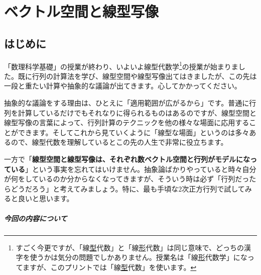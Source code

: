 \chapter{ベクトル空間と線型写像}

\vspace{-0.8zw}

\section{はじめに}

「数理科学基礎」の授業が終わり、いよいよ線型代数学\footnote{すごく今更ですが、「線\uline{型}代数」と「線\uline{形}代数」は同じ意味で、どっちの漢字を使うかは気分の問題でしかありません。授業名は「線\uline{形}代数学」になってますが、このプリントでは「線\uline{型}代数」を使います。}の授業が始まりました。既に行列の計算法を学び、線型空間や線型写像出てはきましたが、この先は一段と重たい計算や抽象的な議論が出てきます。心してかかってください。

抽象的な議論をする理由は、ひとえに「適用範囲が広がるから」です。普通に行列を計算しているだけでもそれなりに得られるものはあるのですが、線型空間と線型写像の言葉によって、行列計算のテクニックを他の様々な場面に応用することができます。そしてこれから見ていくように「線型な場面」というのは多々あるので、線型代数を理解しているとこの先の人生で非常に役立ちます。

一方で「\textbf{線型空間と線型写像は、それぞれ数ベクトル空間と行列がモデルになっている}」という事実を忘れてはいけません。抽象論ばかりやっていると時々自分が何をしているのか分からなくなってきますが、そういう時は必ず「行列だったらどうだろう」と考えてみましょう。特に、最も手頃な$2$次正方行列で試してみると良いと思います。

\paragraph{今回の内容について}

